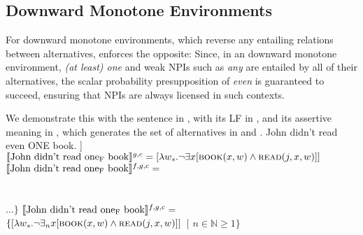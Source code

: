 \subsection{Downward Monotone Environments}
For downward monotone environments, which reverse any entailing relations between alternatives,  enforces the opposite: Since, in an downward monotone environment, \textit{(at least) one} and weak NPIs such as \textit{any} are entailed by all of their alternatives, the scalar probability presupposition of \textit{even} is guaranteed to succeed, ensuring that NPIs are always licensed in such contexts.

We demonstrate this with the sentence in , with its LF in , and its assertive meaning in , which generates the set of alternatives in  and .
\pex[nopreamble=true]%
\a{} John didn't read even \MakeUppercase{one} book.
\a[]\phantomsection [even\textsubscript{C} [not [John read one\textsubscript{F} book]]
\a{} $\intension[g,c]{John didn't read one\textsubscript{F} book}=[\lambda{w_s}.\neg\exists{x}[\predicate{book}(x,w)\land\predicate{read}(j,x,w)]]$
\a{} $\intension[f,g,c]{John didn't read one\textsubscript{F} book}=$\\
\\
\\
$\ldots\}$
\a{} $\intension[f,g,c]{John didn't read one\textsubscript{F} book}=$\\\emptyfill$\{[\lambda{w_s}.\neg\exists_n{x}[\predicate{book}(x,w)\land\predicate{read}(j,x,w)]]$~| $n\in\mathbb{N}\geqslant1\}$
